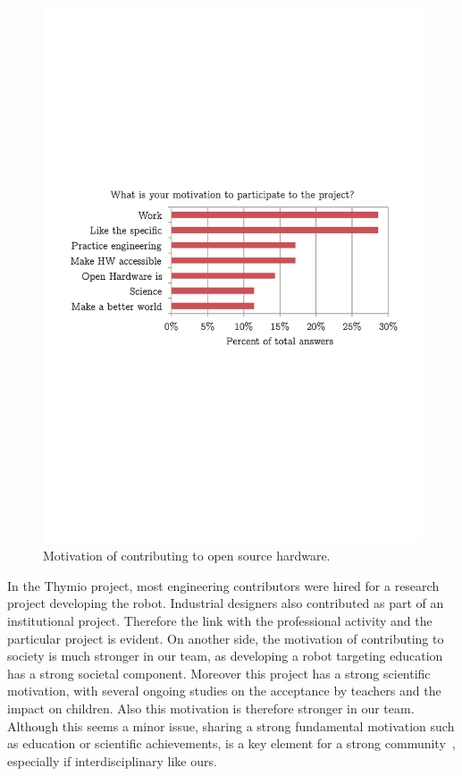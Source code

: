\documentclass[letterpaper, 10 pt, conference]{ieeeconf}  %
\begin{document}
\begin{figure}
\centering
\includegraphics[width=\columnwidth]{figures/motivation}
\caption{Motivation of contributing to open source hardware.}
\label{fig:motivation}
\end{figure}

In the Thymio project, most engineering contributors were hired for a research project developing the robot. 
Industrial designers also contributed as part of an institutional project.
Therefore the link with the professional activity and the particular project is evident.
On another side, the motivation of contributing to society is much stronger in our team, as developing a robot targeting education has a strong societal component.
Moreover this project has a strong scientific motivation, with several ongoing studies on the acceptance by teachers and the impact on children.
Also this motivation is therefore stronger in our team.
Although this seems a minor issue, sharing a strong fundamental motivation such as education or scientific achievements, is a key element for a strong community~\cite{Stahlbrost2011}, especially if interdisciplinary like ours.
\end{document}
